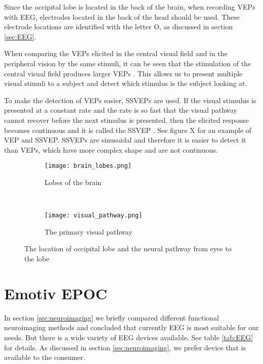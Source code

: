 Since the occipital lobe is located in the back of the brain, when recording \glspl{VEP} with \gls{EEG}, electrodes located in the back of the head should be used. These electrode locations are identified with the letter O, as discussed in section \ref{sec:EEG}.

When comparing the \glspl{VEP} elicited in the central visual field and in the peripheral vision by the same stimuli, it can be seen that the stimulation of the central visual field produces larger \glspl{VEP} \cite{VEP_size}. This allows us to present multiple visual stimuli to a subject and detect which stimulus is the subject looking at. 

To make the detection of \glspl{VEP} easier, \glspl{SSVEP} are used. If the visual stimulus is presented at a constant rate and the rate is so fast that the visual pathway cannot recover before the next stimulus is presented, then the elicited response becomes continuous and it is called the \gls{SSVEP} \cite{VEP}. See figure X for an example of \gls{VEP} and \gls{SSVEP}. \glspl{SSVEP} are sinusoidal and therefore it is easier to detect it than \glspl{VEP}, which have more complex shape and are not continuous.

\begin{figure}[h]
	\centering
	\begin{subfigure}{0.48\textwidth}
		\texttt{[image: brain\_lobes.png]}
		\caption{Lobes of the brain \cite{blausen}}
		\label{fig:brain_lobes}
	\end{subfigure}
	~
	\begin{subfigure}{0.48\textwidth}
		\texttt{[image: visual\_pathway.png]}
		\caption{The primary visual pathway \cite[p.~261]{neuroscience}}
		\label{fig:visual_pathway}
	\end{subfigure}
	\caption{The location of occipital lobe and the neural pathway from eyes to the lobe}
	\label{fig:lobes_pathway}
\end{figure}

\section{Emotiv EPOC}

In section \ref{sec:neuroimaging} we briefly compared different functional neuroimaging methods and concluded that currently \gls{EEG} is most suitable for our needs. But there is a wide variety of EEG devices available. See table \ref{tab:EEG} for details. As discussed in section \ref{sec:neuroimaging}, we prefer device that is available to the consumer.

